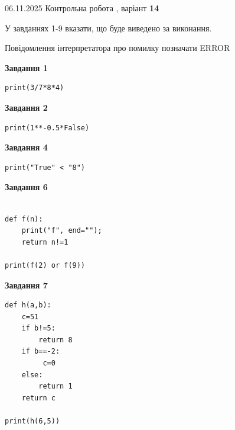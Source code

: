 \documentclass[12pt, ukrainian]{article}
\begin{document}
{\Large{06.11.2025 Контрольна робота , варіант  \No \textbf { 14 }\par}}
{
\begin {large}
У завданнях 1-9 вказати, що буде виведено за виконання.

Повідомлення інтерпретатора про помилку позначати ERROR

\begin{minipage}[t]{7.5cm}

\begin{center}
\textbf{Завдання 1}
\end{center}

\begin{verbatim}
print(3/7*8*4)
\end{verbatim}



\begin{center}
\textbf{Завдання 2}
\end{center}

\begin{verbatim}
print(1**-0.5*False)
\end{verbatim}



\begin{center}
\textbf{Завдання 4}
\end{center}

\begin{verbatim}
print("True" < "8")
\end{verbatim}



\begin{center}
\textbf{Завдання 6}
\end{center}

\begin{verbatim}

def f(n):
    print("f", end="");
    return n!=1

print(f(2) or f(9))
\end{verbatim}



\begin{center}
\textbf{Завдання 7}
\end{center}

\begin{verbatim}
def h(a,b):
    c=51
    if b!=5:
        return 8
    if b==-2:
         c=0
    else: 
        return 1
    return c

print(h(6,5))
\end{verbatim}


\end{minipage}
\end{large}}
\end{document}
